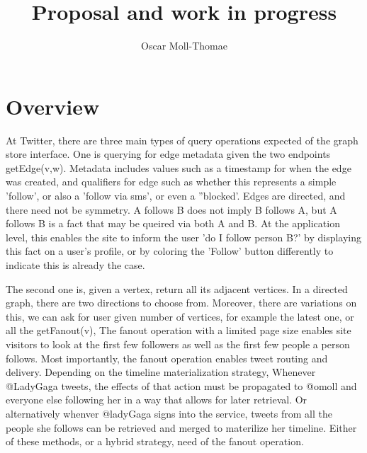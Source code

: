 \documentclass{article}
\author{Oscar Moll-Thomae}
\title{Proposal and work in progress}
\begin{document}
\maketitle


\newcommand{\code}{\ttfamily}
\newcommand{\draftnote}[2][inline]{\todo[#1]{{\bf NOTE:} #2}}
\newcommand{\todonote}[2][inline]{\todo[#1]{{\bf TODO:} #2}}

\newcommand{\edgeq}{{\code getEdge()}}
\newcommand{\fanoutq}[1][]{{\code getFanout(}~#1~{\code )}}
\newcommand{\intersectq}{{\code getIntersection()}}
\newcommand{\randomwalk}{{\code randomWalk()}}




\section{Overview}

At Twitter, there are three main types of query operations expected of the graph store interface. One is querying for edge metadata given the two endpoints {\code getEdge(v,w)}. Metadata includes values such as a timestamp for when the edge was created, and qualifiers for edge such as whether this represents a simple 'follow', or also a  'follow via sms', or even a ''blocked'. Edges are directed, and there need not be symmetry.  A follows B does not imply B follows A, but A follows B is a fact that may be queired via both A and B. At the application level, this enables the site to inform the user  'do I follow person B?' by displaying this fact on a user's profile, or by coloring the 'Follow' button differently to indicate this is already the case.   

The second one is, given a vertex, return all its adjacent vertices. In a directed graph, there are two directions
to choose from. Moreover, there are variations on this, we can ask for user given number of vertices, for example the latest one, or all the   {\code getFanout(v)}, The fanout operation with a limited page size enables site visitors to look at the first few followers as well as the first few people a person follows.   Most importantly, the fanout operation enables tweet routing and delivery. Depending on the timeline materialization strategy, Whenever @LadyGaga tweets, the effects of that action must be propagated to @omoll and  everyone else following her in a way that allows for later retrieval.  Or alternatively whenver @ladyGaga signs into the service, tweets from all the people she follows can be retrieved and merged to materilize her timeline. Either of these methods, or a hybrid strategy, need of the fanout operation.
\end{document}
